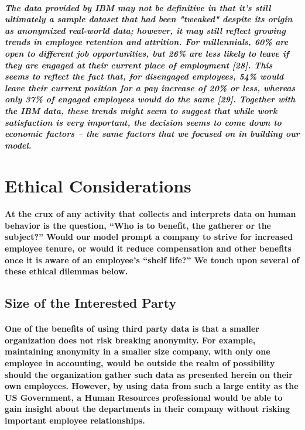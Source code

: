 \documentclass{article}
\begin{document}
\subparagraph{The data provided by IBM may not be definitive in that it's still ultimately a sample dataset that had been "tweaked" despite its origin as anonymized real-world data; however, it may still reflect growing trends in employee retention and attrition. For millennials, 60\% are open to different job opportunities, but 26\% are less likely to leave if they are engaged at their current place of employment [28]. This seems to reflect the fact that, for disengaged employees, 54\% would leave their current position for a pay increase of 20\% or less, whereas only 37\% of engaged employees would do the same [29]. Together with the IBM data, these trends might seem to suggest that while work satisfaction is very important, the decision seems to come down to economic factors – the same factors that we focused on in building our model.}
 
\section{Ethical Considerations}

\paragraph{At the crux of any activity that collects and interprets data on human behavior is the question, “Who is to benefit, the gatherer or the subject?” Would our model prompt a company to strive for increased employee tenure, or would it reduce compensation and other benefits once it is aware of an employee’s “shelf life?” We touch upon several of these ethical dilemmas below.}
 
\subsection{Size of the Interested Party}

\paragraph{One of the benefits of using third party data is that a smaller organization does not risk breaking anonymity. For example, maintaining anonymity in a smaller size company, with only one employee in accounting, would be outside the realm of possibility should the organization gather such data as presented herein on their own employees. However, by using data from such a large entity as the US Government, a Human Resources professional would be able to gain insight about the departments in their company without risking important employee relationships.}
 
\end{document}
